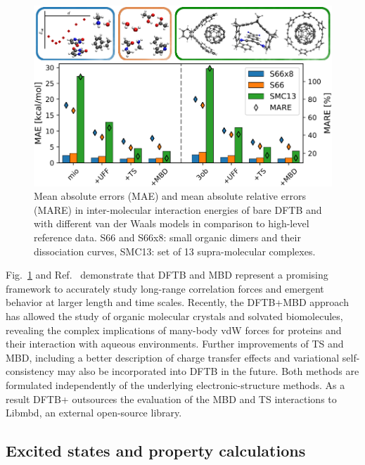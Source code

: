 \documentclass[reprint,onecolumn,superscriptaddress]{revtex4-1}
\newcommand{\dftbp}{DFTB+}
\begin{document}
\begin{figure}[htbp]
  \centering
  \includegraphics[scale=1.]{figures/DFTBvdW_benchmark_MAEs.pdf}
  \caption{\label{fig:dftbvdw_benchmarks} Mean absolute errors (MAE) and mean
    absolute relative errors (MARE) in inter-molecular interaction energies of
    bare DFTB and with different van der Waals models in comparison to
    high-level reference data. S66 and S66x8: small organic dimers and their
    dissociation curves,\cite{Rezac2011_S66,Rezac2011_S66x8} SMC13: set of 13
    supra-molecular
    complexes.\cite{Ambrosetti2014_JPCL,Hermann2017,Stoehr2019_CSR}}
\end{figure}
%
Fig.~\ref{fig:dftbvdw_benchmarks} and Ref.~\cite{Stoehr2016} demonstrate
that DFTB and MBD represent a promising framework to accurately study long-range
correlation forces and emergent behavior at larger length and time
scales. Recently, the DFTB+MBD approach has allowed the study of organic
molecular crystals\cite{mortazavi2018} and solvated biomolecules, revealing the
complex implications of many-body vdW forces for proteins and their interaction
with aqueous environments.\cite{Stoehr2019} Further improvements of TS and MBD,
including a better description of charge transfer effects\cite{Gould2016} and
variational self-consistency\cite{Ferri2015} may also be incorporated into DFTB
in the future.  Both methods are formulated independently of the underlying
electronic-structure methods. As a result \dftbp{} outsources the evaluation of
the MBD and TS interactions to Libmbd,\cite{libmbd} an external open-source
library.


\subsection{Excited states and property calculations}
\end{document}
